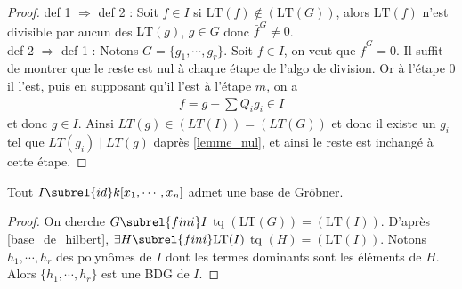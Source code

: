         \begin{proof}
            def 1 $\Rightarrow$ def 2 : Soit $f \in I$ si $\mathrm{LT}(f) \notin (\mathrm{LT}(G))$, alors $\mathrm{LT}(f)$ n'est divisible par aucun des $\mathrm{LT}(g)$, $g \in G$ donc $\bar f^G \neq 0$. \\
            def 2 $\Rightarrow$ def 1 : Notons $G = \{g_1, \cdots, g_r\}$. Soit $f \in I$, on veut que $\bar f^G = 0$. Il suffit de montrer que le reste est nul à chaque étape de l'algo de division. Or à l'étape $0$ il l'est, puis en supposant qu'il l'est à l'étape $m$, on a
            \begin{align*}
                f = g + \sum Q_i g_i \in I
            \end{align*}
            et donc $g \in I$. Ainsi $LT(g) \in (LT(I)) = (LT(G))$ et donc il existe un $g_i$ tel que $LT(g_i) \mid LT(g)$ daprès \ref{lemme_nul}, et ainsi le reste est inchangé à cette étape.
        \end{proof}
        \begin{theo}
            Tout $I \subrel{id} k[x_1, \cdots, x_n]$ admet une base de Gröbner.
        \end{theo}
        \begin{proof}
            On cherche $G \subrel{fini} I$ tq $(\mathrm{LT}(G)) = (\mathrm{LT}(I))$. D'après \ref{base_de_hilbert}, $\exists H \subrel{fini} \mathrm{LT}(I)$ tq $(H) = (\mathrm{LT}(I))$. Notons $h_1, \cdots, h_r$ des polynômes de $I$ dont les termes dominants sont les éléments de $H$. Alors $\{h_1, \cdots, h_r\}$ est une BDG de $I$.
        \end{proof}

